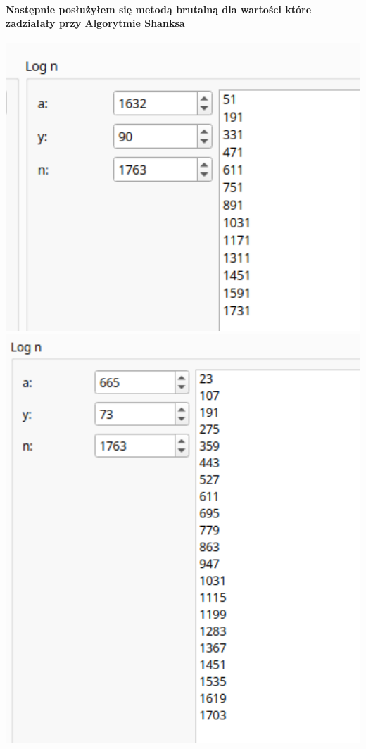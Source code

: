 \documentclass{article}[12pt]
\begin{document}
\paragraph{Następnie posłużyłem się metodą brutalną dla wartości które zadziałały przy Algorytmie Shanksa \\ }
\includegraphics[width=1\textwidth]{fourteen.png} 
\includegraphics[width=1\textwidth]{fifteen.png} 
\end{document}
